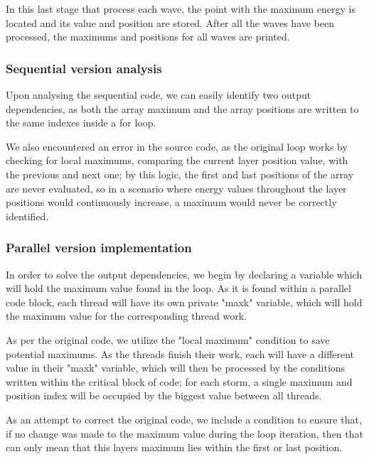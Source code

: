 
In this last stage that process each wave, the
point with the maximum energy is located and its value and position are stored.
After all the waves have been processed, the maximums and positions for all waves
are printed.
\subsubsection{Sequential version analysis}
Upon analysing the sequential code, we can easily identify two output dependencies, as both the array maximum and the array positions are written to the same indexes inside a for loop. 

We also encountered an error in the source code, as the original loop works by checking for local maximums, comparing the current layer position value, with the previous and next one; by this logic, the first and last positions of the array are never evaluated, so in a scenario where energy values throughout the layer positions would continuously increase, a maximum would never be correctly identified.
\subsubsection{Parallel version implementation}
In order to solve the output dependencies, we begin by declaring a variable which will hold the maximum value found in the loop. As it is found within a parallel code block, each thread will have its own private "maxk" variable, which will hold the maximum value for the corresponding thread work.

As per the original code, we utilize the "local maximum" condition to save potential maximums. As the threads finish their work, each will have a different value in their "maxk" variable, which will then be processed by the conditions written within the critical block of code; for each storm, a single maximum and position index will be occupied by the biggest value between all threads.

As an attempt to correct the original code, we include a condition to ensure that, if no change was made to the maximum value during the loop iteration, then that can only mean that this layers maximum lies within the first or last position.
